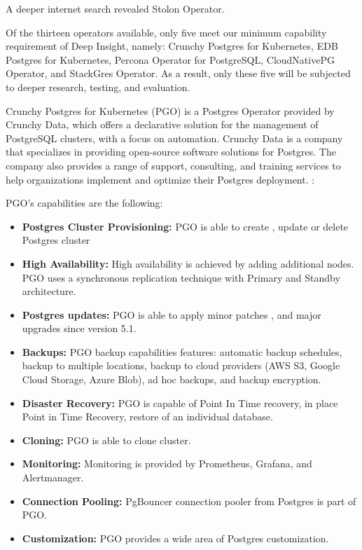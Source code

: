 A deeper internet search revealed Stolon Operator. \cite{PalarkComparingKubernetes}

Of the thirteen operators available, only five meet our minimum capability requirement of Deep Insight, namely: Crunchy Postgres for Kubernetes, EDB Postgres for Kubernetes, Percona Operator for PostgreSQL, CloudNativePG Operator, and StackGres Operator. As a result, only these five will be subjected to deeper research, testing, and evaluation.

\pagebreak
{}
Crunchy Postgres for Kubernetes (PGO) is a Postgres Operator provided by Crunchy Data, which offers a declarative solution for the management of PostgreSQL clusters, with a focus on automation.
Crunchy Data is a company that specializes in providing open-source software solutions for Postgres. The company also provides a range of support, consulting, and training services to help organizations implement and optimize their Postgres deployment. \cite{Crunchy}:

PGO’s capabilities are the following:
\begin{itemize}
  \item \textbf{Postgres Cluster Provisioning:} PGO is able to create \cite{CrunchyDocCreate}, update \cite{CrunchyDocUpdate} or delete Postgres cluster \cite{CrunchyDocDelete}
  \item \textbf{High Availability:} High availability is achieved by adding additional nodes. PGO uses a synchronous replication technique with Primary and Standby architecture. \cite{CrunchyDocHA}
  \item \textbf{Postgres updates:} PGO is able to apply minor patches \cite{CrunchyDocMinorUpdates}, and major upgrades since version 5.1. \cite{CrunchyBlogUpdates}
  \item \textbf{Backups:} PGO backup capabilities features: automatic backup schedules, backup to multiple locations, backup to cloud providers (AWS S3, Google Cloud Storage, Azure Blob), ad hoc backups, and backup encryption. \cite{CrunchyDocBackups}
  \item \textbf{Disaster Recovery:} PGO is capable of Point In Time recovery, in place Point in Time Recovery, restore of an individual database. \cite{CrunchyDocDisasterRecovery}
  \item \textbf{Cloning:} PGO is able to clone cluster. \cite{CrunchyDocDisasterRecovery}
  \item \textbf{Monitoring:} Monitoring is provided by Prometheus, Grafana, and Alertmanager. \cite{CrunchyDocMonitoring}
  \item \textbf{Connection Pooling:} PgBouncer connection pooler from Postgres is part of PGO. \cite{CrunchyDocConnectionPooling}
  \item  \textbf{Customization:} PGO provides a wide area of Postgres customization. \cite{CrunchyDocCustomisation}
\end{itemize}

